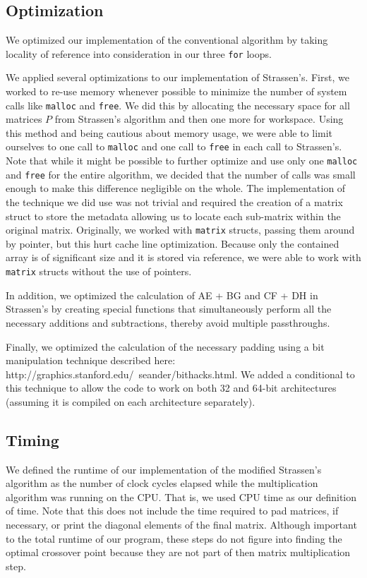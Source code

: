 \documentclass[solution, letterpaper]{cs121}
\begin{document}
\subsection*{Optimization}
\hspace{4mm} We optimized our implementation of the conventional algorithm by taking locality of reference into consideration in our three {\tt for} loops.

We applied several optimizations to our implementation of Strassen's. First, we worked to re-use memory whenever possible to minimize the number of system calls like \texttt{malloc} and \texttt{free}. We did this by allocating the necessary space for all matrices $P$ from Strassen's algorithm and then one more for workspace. Using this method and being cautious about memory usage, we were able to limit ourselves to one call to \texttt{malloc} and one call to \texttt{free} in each call to Strassen's. Note that while it might be possible to further optimize and use only one \texttt{malloc} and \texttt{free} for the entire algorithm, we decided that the number of calls was small enough to make this difference negligible on the whole. The implementation of the technique we did use was not trivial and required the creation of a matrix struct to store the metadata allowing us to locate each sub-matrix within the original matrix. Originally, we worked with \texttt{matrix} structs, passing them around by pointer, but this hurt cache line optimization. Because only the contained array is of significant size and it is stored via reference, we were able to work with \texttt{matrix} structs without the use of pointers.

In addition, we optimized the calculation of AE + BG and CF + DH in Strassen's by creating special functions that simultaneously perform all the necessary additions and subtractions, thereby avoid multiple passthroughs.

Finally, we optimized the calculation of the necessary padding using a bit manipulation technique described here: http://graphics.stanford.edu/~seander/bithacks.html. We added a conditional to this technique to allow the code to work on both 32 and 64-bit architectures (assuming it is compiled on each architecture separately).

\subsection*{Timing}
We defined the runtime of our implementation of the modified Strassen's algorithm as the number of clock cycles elapsed while the multiplication algorithm was running on the CPU. That is, we used CPU time as our definition of time. Note that this does not include the time required to pad matrices, if necessary, or print the diagonal elements of the final matrix. Although important to the total runtime of our program, these steps do not figure into finding the optimal crossover point because they are not part of then matrix multiplication step.
\end{document}
